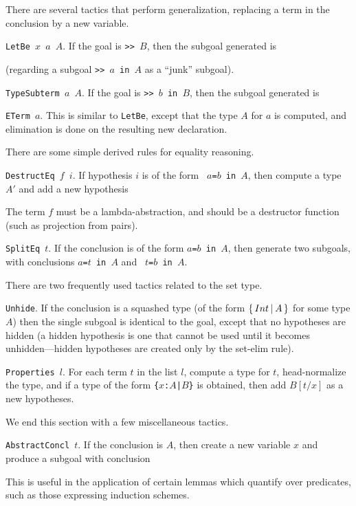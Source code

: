 There are several tactics that perform generalization, replacing a term in the
conclusion by a new variable.

{\tt LetBe $x$ $a$ $A$}.  If the goal is {\tt >>~$B$}, then the subgoal
generated is
\begin{Numath}
\end{Numath}%
(regarding a subgoal {\tt >>~$a$~in~$A$} as a ``junk'' subgoal).

{\tt TypeSubterm $a$ $A$}. If the goal is {\tt >>~$b$ in $B$}, then the subgoal
generated is
\begin{Numath}
\end{Numath}%

{\tt ETerm $a$}.  This is similar to {\tt LetBe}, except that the type $A$ for $a$
is computed, and elimination is done on the resulting new declaration.

There are some simple derived rules for equality reasoning.

{\tt DestructEq $f$ $i$}.  If hypothesis $i$ is of the form {\tt
$a$=$b$~in~$A$}, then compute a type $A'$ and add a new hypothesis 
\begin{Numath}
\end{Numath}%
The term $f$ must be a lambda-abstraction, and should be a destructor function
(such as projection from pairs).

{\tt SplitEq $t$}.  If the conclusion is of the form {\tt $a$=$b$~in~$A$}, then
generate two subgoals, with conclusions {\tt $a$=$t$~in~$A$} and {\tt
$t$=$b$~in~$A$}.

There are two frequently used tactics related to the set type.

{\tt Unhide}.  If the conclusion is a squashed type (of the form
$\{ \, Int \, | \: A \, \}$ for some type $A$)
then the single subgoal is identical to the goal,
except that no hypotheses are hidden (a hidden hypothesis is one that cannot be
used until it becomes unhidden---hidden hypotheses are created only by the
set-elim rule). 

{\tt Properties $l$}.  For each term $t$ in the list $l$, compute a type for
$t$, head-normalize the type, and if a type of the form {\tt \{$x$:$A$|$B$\}} is
obtained, then add $B[t/x]$ as a new hypotheses.

We end this section with a few miscellaneous tactics.

{\tt AbstractConcl $t$}.  If the conclusion is $A$, then create a new variable
$x$ and produce a subgoal with conclusion
\begin{Numath}
\end{Numath}%
This is useful in the application of certain lemmas which quantify over
predicates, such as those expressing induction schemes.

